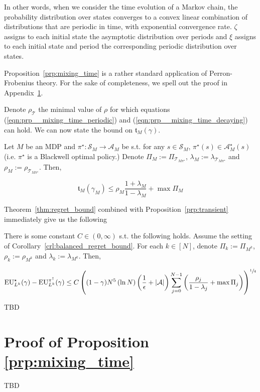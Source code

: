 \documentclass[anon,12pt]{colt2018} %
\newcommand{\AP}[1]{\left(#1\right)}
\newcommand{\Abs}[1]{\left\vert #1 \right\vert}
\newcommand{\A}{\mathcal{A}}
\newcommand{\St}{\mathcal{S}}
\newcommand{\T}{\mathcal{T}}
\newcommand{\EU}{\operatorname{EU}}
\newcommand{\Tn}{\mathfrak{t}}
\begin{document}
In other words, when we consider the time evolution of a Markov chain, the probability distribution over states converges to a convex linear combination of distributions that are periodic in time, with exponential convergence rate. $\zeta$ assigns to each initial state the asymptotic distribution over periods and $\xi$ assigns to each initial state and period the corresponding periodic distribution over states.

Proposition~\ref{prp:mixing_time} is a rather standard application of Perron-Frobenius theory. For the sake of completeness, we spell out the proof in Appendix~\ref{sec:proof__prp__mixing_time}.

Denote $\rho_\T$ the minimal value of $\rho$ for which equations (\ref{eqn:prp__mixing_time_periodic}) and (\ref{eqn:prp__mixing_time_decaying}) can hold. We can now state the bound on $\Tn_M(\gamma)$.

\begin{samepage}
\begin{proposition}
\label{prp:transient}

Let $M$ be an MDP and $\pi^\star: \St_M \rightarrow \A_M$ be s.t. for any $s \in \St_M$, $\pi^\star(s)\in\A_M^\star(s)$ (i.e. $\pi^\star$ is a Blackwell optimal policy.) Denote $\Pi_M:=\Pi_{\T_{M\pi^\star}}$, $\lambda_M:=\lambda_{\T_{M\pi^\star}}$ and $\rho_M:=\rho_{\T_{M\pi^\star}}$. Then,

\begin{equation}
\Tn_M\AP{\gamma_M} \leq \rho_M \frac{1+\lambda_M}{1-\lambda_M} + \max{\Pi_M}
\end{equation}

\end{proposition}
\end{samepage}

Theorem~\ref{thm:regret_bound} combined with Proposition~\ref{prp:transient} immediately give us the following

\begin{samepage}
\begin{corollary}
\label{crl:regret_bound_mixing}

There is some constant $C \in (0,\infty)$ s.t. the following holds. Assume the setting of Corollary~\ref{crl:balanced_regret_bound}. For each $k \in [N]$, denote $\Pi_k:=\Pi_{M^k}$, $\rho_k:=\rho_{M^k}$ and $\lambda_k:=\lambda_{M^k}$. Then,

\begin{equation}
\EU_{L^k}^\star(\gamma) - \EU_{L^k}^{\pi^\dagger}(\gamma) \leq C\AP{(1-\gamma)N^5 \AP{\ln N} \AP{\frac{1}{\epsilon}+\Abs{\A}}\sum_{j=0}^{N-1} \AP{\frac{\rho_j}{1-\lambda_j}+\max{\Pi_j}}}^{\sfrac{1}{4}}
\end{equation}

\end{corollary}
\end{samepage}

TBD






\appendix

\section{Proof of Proposition \ref{prp:mixing_time}}
\label{sec:proof__prp__mixing_time}

TBD
\end{document}
